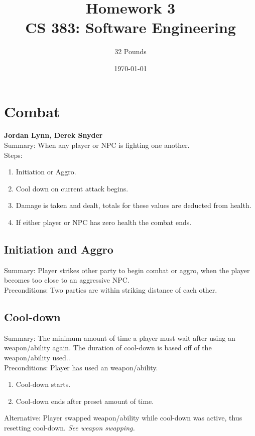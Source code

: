 \documentclass[12pt]{report}
\begin{document}
\title{Homework 3\\ \vspace{2 mm} {\large CS 383: Software Engineering}}

\author{32 Pounds}
\date{\today}
\maketitle
\clearpage

\chapter{Combat}
\textbf{Jordan Lynn, Derek Snyder} \\
Summary: When any player or NPC is fighting one another.\\
    
    Steps:
    \begin{enumerate}
        \item Initiation or Aggro.
        \item Cool down on current attack begins.
        \item Damage is taken and dealt, totals for these values are deducted from health.
        \item If either player or NPC has zero health the combat ends.
    \end{enumerate}
    
    \section{Initiation and Aggro}
    Summary: Player strikes other party to begin combat or aggro, when the player becomes too close to an aggressive NPC.\\
    Preconditions: Two parties are within striking distance of each other. %
    
    \section{Cool-down}
    Summary: The minimum amount of time a player must wait after using an weapon/ability again. The duration of cool-down is based off of the weapon/ability used..\\ %
    Preconditions: Player has used an weapon/ability.\\
    
    \begin{enumerate}
        \item Cool-down starts.
        \item Cool-down ends after preset amount of time.
    \end{enumerate}
    Alternative: Player swapped weapon/ability while cool-down was active, thus resetting cool-down. \textit{See weapon swapping.}
\end{document}
